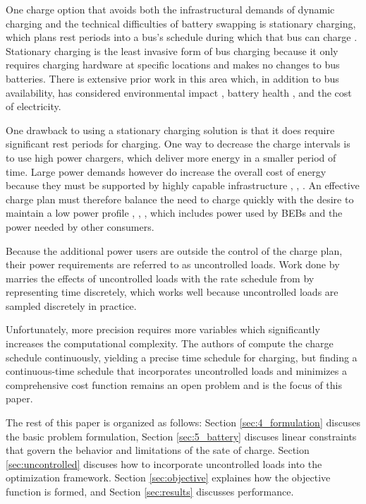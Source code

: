 \par One charge option that avoids both the infrastructural demands of dynamic charging and the technical difficulties of battery swapping is stationary charging, which plans rest periods into a bus's schedule during which that bus can charge \cite{whitaker_network_nodate}. Stationary charging is the least invasive form of bus charging because it only requires charging hardware at specific locations and makes no changes to bus batteries. There is extensive prior work in this area which, in addition to bus availability, has considered environmental impact \cite{zhou_bi-objective_2021}, battery health \cite{houbbadi_optimal_2019}, and the cost of electricity.
\par One drawback to using a stationary charging solution is that it does require significant rest periods for charging. One way to decrease the charge intervals is to use high power chargers, which deliver more energy in a smaller period of time. Large power demands however do increase the overall cost of energy because they must be supported by highly capable infrastructure \cite{stahleder_impact_2019}, \cite{deb_impact_2017}, \cite{boonraksa_impact_2019}. An effective charge plan must therefore balance the need to charge quickly with the desire to maintain a low power profile \cite{cheng_smart_2020}, \cite{ojer_development_2020}, \cite{qin_numerical_2016}, \cite{bagherinezhad_spatio-temporal_2020} which includes power used by BEBs and the power needed by other consumers.  
\par Because the additional power users are outside the control of the charge plan, their power requirements are referred to as uncontrolled loads. Work done by \cite{mortensen_comprehensive_2021} marries the effects of uncontrolled loads with the rate schedule from \cite{rocky_mountain_power_rocky_2021} by representing time discretely, which works well because uncontrolled loads are sampled discretely in practice. 
\par Unfortunately, more precision requires more variables which significantly increases the computational complexity. The authors of \cite{brown_position_nodate} compute the charge schedule continuously, yielding a precise time schedule for charging, but finding a continuous-time schedule that incorporates uncontrolled loads and minimizes a comprehensive cost function remains an open problem and is the focus of this paper. 
\par The rest of this paper is organized as follows: Section \ref{sec:4_formulation} discuses the basic problem formulation, Section \ref{sec:5_battery} discuses linear constraints that govern the behavior and limitations of the sate of charge. Section \ref{sec:uncontrolled} discuses how to incorporate uncontrolled loads into the optimization framework. Section \ref{sec:objective} explaines how the objective function is formed, and Section \ref{sec:results} discusses performance.
